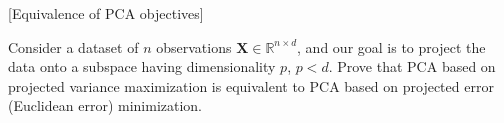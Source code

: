 \item {} [Equivalence of PCA objectives]

Consider a dataset of $n$ observations $\mathbf{X}\in \mathbb{R}^{n \times d}$, and our goal is to project the data onto a subspace having dimensionality $p$, $p<d$. Prove that PCA based on projected variance maximization is equivalent to PCA based on projected error (Euclidean error) minimization.

\solution















\newpage